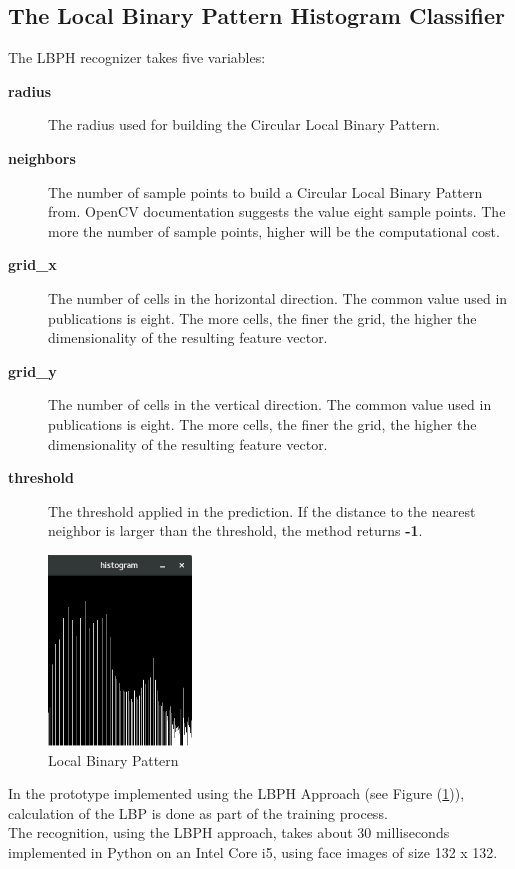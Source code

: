 \subsection{The Local Binary Pattern Histogram Classifier}
The LBPH recognizer takes five variables: \\
\begin{description}
  \item[\textbf{radius}] \quad
  The radius used for building the Circular Local Binary Pattern.

  \item[\textbf{neighbors}] \quad
  The number of sample points to build a Circular Local Binary Pattern from.
  OpenCV documentation suggests the value eight sample points.
  The more the number of sample points, higher will be the computational cost.

  \item[\textbf{grid\_x}] \quad
  The number of cells in the horizontal direction.
  The common value used in publications is eight.
  The more cells, the finer the grid, the higher the dimensionality of the resulting feature vector.

  \item[\textbf{grid\_y}] \quad
  The number of cells in the vertical direction.
  The common value used in publications is eight.
  The more cells, the finer the grid, the higher the dimensionality of the resulting feature vector.

  \item[\textbf{threshold}] \quad
  The threshold applied in the prediction.
  If the distance to the nearest neighbor is larger than the threshold, the method returns \textbf{-1}.
\end{description}

\begin{figure}[!t]
\centering
\includegraphics[width=1.5in]{./histogram.png}
\caption{Local Binary Pattern}
\label{fig:lbph}
\end{figure}

In the prototype implemented using the LBPH Approach (see Figure (\ref{fig:lbph})), calculation of the
LBP is done as part of the training process. \\
The recognition, using the LBPH approach, takes about 30 milliseconds
implemented in Python on an Intel Core i5, using face images of size 132 x 132. \\
